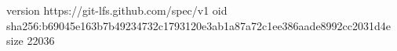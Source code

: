 version https://git-lfs.github.com/spec/v1
oid sha256:b69045e163b7b49234732c1793120e3ab1a87a72c1ee386aade8992cc2031d4e
size 22036
